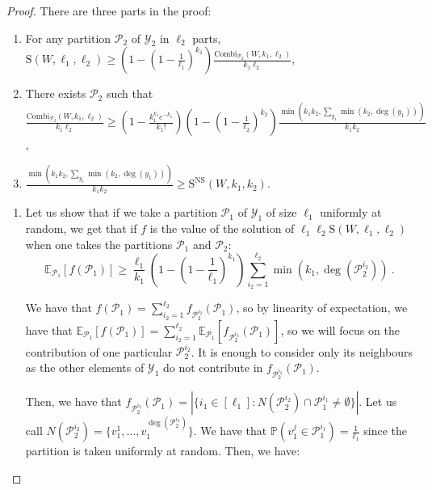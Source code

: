 \documentclass[11pt]{article}
\theoremstyle{definition}
\theoremstyle{remark}
\begin{document}
\begin{proof}
  There are three parts in the proof:
  \begin{enumerate}
  \item For any partition $\mathcal{P}_2$ of $\mathcal{Y}_2$ in $\ell_2$ parts, $\mathrm{S}(W,\ell_1,\ell_2) \geq \left(1-\left(1-\frac{1}{\ell_1}\right)^{k_1}\right)\frac{\textrm{Combi}_{\mathcal{P}_2}(W,k_1,\ell_2)}{k_1\ell_2}$,
  \item There exists $\mathcal{P}_2$ such that $\frac{\textrm{Combi}_{\mathcal{P}_2}(W,k_1,\ell_2)}{k_1\ell_2} \geq \left(1 - \frac{k_1^{k_1}e^{-k_1}}{k_1!}\right)\left(1-\left(1-\frac{1}{\ell_2}\right)^{k_2}\right)\frac{\min\left(k_1k_2,\sum_{y_1}\min(k_2,\deg(y_1))\right)}{k_1k_2}$,
  \item $\frac{\min\left(k_1k_2,\sum_{y_1}\min(k_2,\deg(y_1))\right)}{k_1k_2} \geq \mathrm{S}^{\textrm{NS}}(W,k_1,k_2)$.
  \end{enumerate}

  \begin{enumerate}
  \item Let us show that if we take a partition $\mathcal{P}_1$ of $\mathcal{Y}_1$ of size $\ell_1$ uniformly at random, we get that if $f$ is the value of the solution of $\ell_1\ell_2\mathrm{S}(W,\ell_1,\ell_2)$ when one takes the partitions $\mathcal{P}_1$ and $\mathcal{P}_2$:
\[ \mathbb{E}_{\mathcal{P}_1}[f(\mathcal{P}_1)] \geq \frac{\ell_1}{k_1}\left(1-\left(1-\frac{1}{\ell_1}\right)^{k_1}\right)\sum_{i_2=1}^{\ell_2}\min\left(k_1,\deg(\mathcal{P}_2^{i_2})\right) \ .\]

We have that $f(\mathcal{P}_1)=\sum_{i_2=1}^{\ell_2}f_{\mathcal{P}_2^{i_2}}(\mathcal{P}_1)$, so by linearity of expectation, we have that $\mathbb{E}_{\mathcal{P}_1}[f(\mathcal{P}_1)] = \sum_{i_2=1}^{\ell_2}\mathbb{E}_{\mathcal{P}_1}[f_{\mathcal{P}_2^{i_2}}(\mathcal{P}_1)]$, so we will focus on the contribution of one particular $\mathcal{P}_2^{i_2}$. It is enough to consider only its neighbours as the other elements of $\mathcal{Y}_1$ do not contribute in $f_{\mathcal{P}_2^{i_2}}(\mathcal{P}_1)$.

Then, we have that $f_{\mathcal{P}_2^{i_2}}(\mathcal{P}_1)=|\{i_1 \in [\ell_1]: N(\mathcal{P}_2^{i_2}) \cap \mathcal{P}_1^{i_1} \not= \emptyset  \}|$. Let us call $N(\mathcal{P}_2^{i_2}) = \{v_1^1, \ldots, v_1^{\deg(\mathcal{P}_2^{i_2})}\}$. We have that $\mathbb{P}\left(v_1^j \in \mathcal{P}_1^{i_1}\right) = \frac{1}{\ell_1}$ since the partition is taken uniformly at random. Then, we have:


\end{enumerate}
\end{proof}
\end{document}
